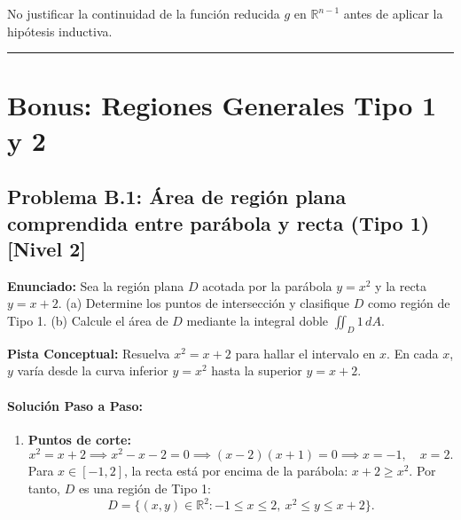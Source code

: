 \documentclass[11pt,a4paper]{article}
\begin{document}
\begin{trapbox}
No justificar la continuidad de la función reducida $g$ en $\mathbb{R}^{n-1}$ antes de aplicar la hipótesis inductiva.
\end{trapbox}

\vspace{0.5cm}
\hrule
\vspace{0.5cm}

\section{Bonus: Regiones Generales Tipo 1 y 2}

\subsection*{Problema B.1: Área de región plana comprendida entre parábola y recta (Tipo 1) \hfill \color{primaryblue}\small[Nivel 2]}

\begin{tcolorbox}[colback=white,colframe=gray!40,arc=1mm,boxrule=0.5pt,left=3mm,right=3mm,top=2mm,bottom=2mm]
\textbf{Enunciado:} Sea la región plana $D$ acotada por la parábola $y = x^2$ y la recta $y = x + 2$. (a) Determine los puntos de intersección y clasifique $D$ como región de Tipo 1. (b) Calcule el área de $D$ mediante la integral doble $\iint_D 1 \, dA$.
\end{tcolorbox}

\begin{tcolorbox}[colback=yellow!4,colframe=accentamber!70,arc=1mm,boxrule=0.5pt,left=3mm,right=3mm,top=1.5mm,bottom=1.5mm]
\textbf{Pista Conceptual:} Resuelva $x^2 = x + 2$ para hallar el intervalo en $x$. En cada $x$, $y$ varía desde la curva inferior $y = x^2$ hasta la superior $y = x + 2$.
\end{tcolorbox}

\paragraph{Solución Paso a Paso:}\par
\begin{enumerate}[label=\textbf{\arabic*.}]
\item \textbf{Puntos de corte:}
\begin{equation*}
x^2 = x + 2 \implies x^2 - x - 2 = 0 \implies (x - 2)(x + 1) = 0 \implies x = -1, \quad x = 2.
\end{equation*}
Para $x \in [-1, 2]$, la recta está por encima de la parábola: $x + 2 \ge x^2$.
Por tanto, $D$ es una región de Tipo 1:
\begin{equation*}
D = \{(x,y) \in \mathbb{R}^2 : -1 \le x \le 2, \ x^2 \le y \le x + 2\}.
\end{equation*}
\end{enumerate}
\end{document}
